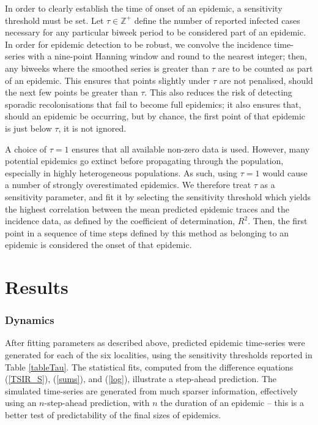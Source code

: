 \documentclass[10pt]{article}
\begin{document}
In order to clearly establish the time of onset of an epidemic, a sensitivity threshold must be set. Let $\tau \in \mathbb{Z}^+$ define the number of reported infected cases necessary for any particular biweek period to be considered part of an epidemic. In order for epidemic detection to be robust, we convolve the incidence time-series with a nine-point Hanning window and round to the nearest integer; then, any biweeks where the smoothed series is greater than $\tau$ are to be counted as part of an epidemic. This ensures that points slightly under $\tau$ are not penalised, should the next few points be greater than $\tau$. This also reduces the risk of detecting sporadic recolonisations that fail to become full epidemics; it also ensures that, should an epidemic be occurring, but by chance, the first point of that epidemic is just below $\tau$, it is not ignored. 

A choice of $\tau = 1$ ensures that all available non-zero data is used. However, many potential epidemics go extinct before propagating through the population, especially in highly heterogeneous populations. As such, using $\tau=1$ would cause a number of strongly overestimated epidemics. We therefore treat $\tau$ as a sensitivity parameter, and fit it by selecting the sensitivity threshold which yields the highest correlation between the mean predicted epidemic traces and the incidence data, as defined by the coefficient of determination, $R^2$. Then, the first point in a sequence of time steps defined by this method as belonging to an epidemic is considered the onset of that epidemic.


















\section*{Results}

\subsubsection*{Dynamics}

After fitting parameters as described above, predicted epidemic time-series were generated for each of the six localities, using the sensitivity thresholds reported in Table \ref{tableTau}. The statistical fits, computed from the difference equations (\ref{TSIR_S}), (\ref{sums}), and (\ref{log}), illustrate a step-ahead prediction. The simulated time-series are generated from much sparser information, effectively using an $n$-step-ahead prediction, with $n$ the duration of an epidemic -- this is a better test of predictability of the final sizes of epidemics.
\end{document}
